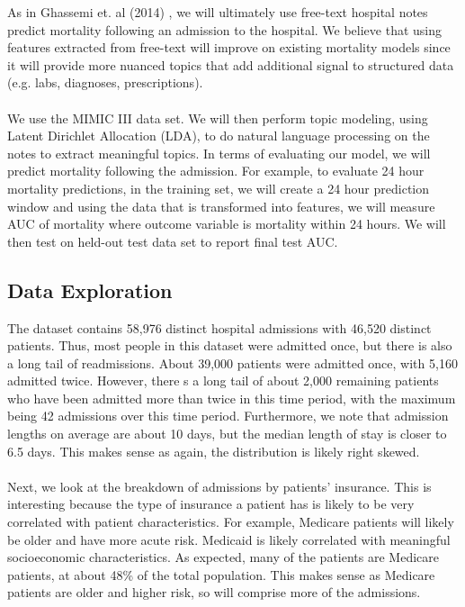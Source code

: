 \documentclass[12pt, final]{article}
\begin{document}
As in Ghassemi et. al (2014) \cite{Ghassemi}, we will ultimately use free-text hospital notes predict mortality following an admission to the hospital. We believe that using features extracted from free-text will improve on existing mortality models since it will provide more nuanced topics that add additional signal to structured data (e.g. labs, diagnoses, prescriptions).
\\
\\
We use the MIMIC III data set. We will then perform topic modeling, using Latent Dirichlet Allocation (LDA), to do natural language processing on the notes to extract meaningful topics. In terms of evaluating our model, we will predict mortality following the admission. For example, to evaluate 24 hour mortality predictions, in the training set, we will create a 24 hour prediction window and using the data that is transformed into features, we will measure AUC of mortality where outcome variable is mortality within 24 hours. We will then test on held-out test data set to report final test AUC.

\subsection{Data Exploration}
\label{Data Exploration}
The dataset contains 58,976 distinct hospital admissions with 46,520 distinct patients. Thus, most people in this dataset were admitted once, but there is also a long tail of readmissions. About 39,000 patients were admitted once, with 5,160 admitted twice. However, there s a long tail of about 2,000 remaining patients who have been admitted more than twice in this time period, with the maximum being 42 admissions over this time period. Furthermore, we note that admission lengths on average are about 10 days, but the median length of stay is closer to 6.5 days. This makes sense as again, the distribution is likely right skewed.
\\
\\
Next, we look at the breakdown of admissions by patients' insurance. This is interesting because the type of insurance a patient has is likely to be very correlated with patient characteristics. For example, Medicare patients will likely be older and have more acute risk. Medicaid is likely correlated with meaningful socioeconomic characteristics. As expected, many of the patients are Medicare patients, at about 48\% of the total population. This makes sense as Medicare patients are older and higher risk, so will comprise more of the admissions.
\end{document}

